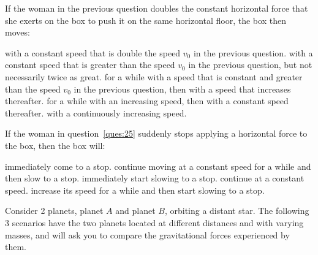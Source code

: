 \documentclass[12pt]{exam}
\begin{document}
\begin{questions}
\question
If the woman in the previous question doubles the constant horizontal force that she exerts on the box to push it on the same horizontal floor, the box then moves:
\begin{choices}
\choice with a constant speed that is double the speed $v_0$ in the previous question.
\choice with a constant speed that is greater than the speed $v_0$ in the previous question, but not necessarily twice as great.
\choice for a while with a speed that is constant and greater than the speed $v_0$ in the previous question, then with a speed that increases thereafter.
\choice for a while with an increasing speed, then with a constant speed thereafter.
\choice with a continuously increasing speed.
\end{choices}

\question
If the woman in question~\ref{ques:25} suddenly stops applying a horizontal force to the box, then the box will:
\begin{choices}
\choice immediately come to a stop.
\choice continue moving at a constant speed for a while and then slow to a stop.
\choice immediately start slowing to a stop.
\choice continue at a constant speed.
\choice increase its speed for a while and then start slowing to a stop.
\end{choices}

\clearpage
\question Consider 2 planets, planet $A$ and planet $B$, orbiting a distant star. The following 3 scenarios have the two planets located at different distances and with varying masses, and will ask you to compare the gravitational forces experienced by them.
\end{questions}
\end{document}
